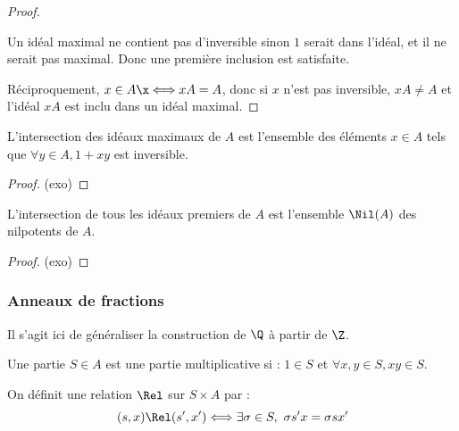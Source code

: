\begin{proof}\
 
Un idéal maximal ne contient pas d'inversible sinon $1$ serait dans l'idéal, et
il ne serait pas maximal. Donc une première inclusion est satisfaite.

Réciproquement, $x\in A\x \Longleftrightarrow xA=A$, donc si $x$ n'est pas
inversible, $xA\neq A$ et l'idéal $xA$ est inclu dans un idéal maximal.
\end{proof}

\begin{prop}
 
L'intersection des idéaux maximaux de $A$ est l'ensemble des éléments $x\in A$
tels que $\forall y\in A, 1+xy$ est inversible.
\end{prop}

\begin{proof} (exo)
\end{proof}

\begin{prop}
 
L'intersection de tous les idéaux premiers de $A$ est l'ensemble $\Nil(A)$ des
nilpotents de $A$.
\end{prop}

\begin{proof} (exo)
\end{proof}


\subsubsection{Anneaux de fractions}
\vspace{0.5em}

Il s'agit ici de généraliser la construction de $\Q$ à partir de $\Z$.

\vspace{0.5em}

\begin{defi}

Une partie $S\in A$ est une partie multiplicative si : $1\in S$ et $\forall
x,y\in S, xy\in S$.

On définit une relation $\Rel$ sur $S\times A$ par : 
\begin{displaymath} (s,x)\Rel(s',x') \Longleftrightarrow \exists \sigma \in
S,\ \sigma s'x = \sigma s x' \end{displaymath}
\end{defi}

